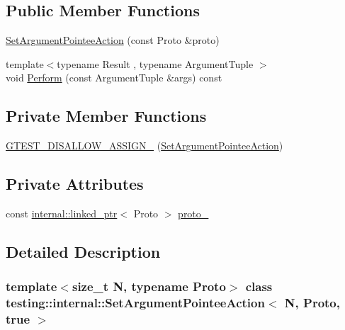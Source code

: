 \subsection*{Public Member Functions}
\begin{DoxyCompactItemize}
\item 
\hyperlink{classtesting_1_1internal_1_1SetArgumentPointeeAction_3_01N_00_01Proto_00_01true_01_4_af08b3a61e483f704e93872987d30ade0}{Set\+Argument\+Pointee\+Action} (const Proto \&proto)
\item 
{\footnotesize template$<$typename Result , typename Argument\+Tuple $>$ }\\void \hyperlink{classtesting_1_1internal_1_1SetArgumentPointeeAction_3_01N_00_01Proto_00_01true_01_4_ac89fa5dde5d2683206a77d29630917cd}{Perform} (const Argument\+Tuple \&args) const
\end{DoxyCompactItemize}
\subsection*{Private Member Functions}
\begin{DoxyCompactItemize}
\item 
\hyperlink{classtesting_1_1internal_1_1SetArgumentPointeeAction_3_01N_00_01Proto_00_01true_01_4_a936f6f5c944c2bd86251b7ef44387006}{G\+T\+E\+S\+T\+\_\+\+D\+I\+S\+A\+L\+L\+O\+W\+\_\+\+A\+S\+S\+I\+G\+N\+\_\+} (\hyperlink{classtesting_1_1internal_1_1SetArgumentPointeeAction}{Set\+Argument\+Pointee\+Action})
\end{DoxyCompactItemize}
\subsection*{Private Attributes}
\begin{DoxyCompactItemize}
\item 
const \hyperlink{classtesting_1_1internal_1_1linked__ptr}{internal\+::linked\+\_\+ptr}$<$ Proto $>$ \hyperlink{classtesting_1_1internal_1_1SetArgumentPointeeAction_3_01N_00_01Proto_00_01true_01_4_aef9287aad8516bfec6cbcf63807c6c87}{proto\+\_\+}
\end{DoxyCompactItemize}


\subsection{Detailed Description}
\subsubsection*{template$<$size\+\_\+t N, typename Proto$>$\newline
class testing\+::internal\+::\+Set\+Argument\+Pointee\+Action$<$ N, Proto, true $>$}



